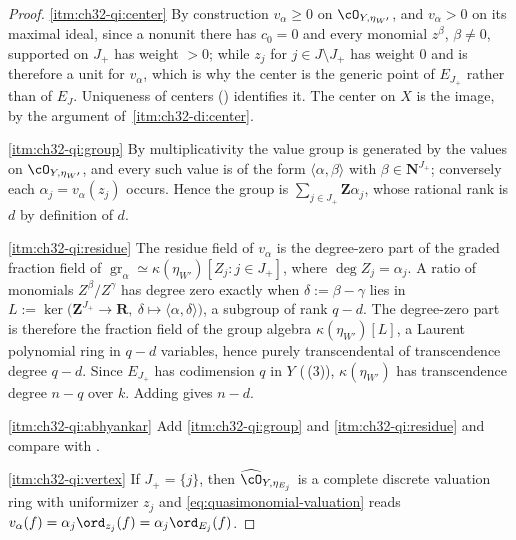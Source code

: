\begin{proof}
\cref{itm:ch32-qi:center}  By construction $v_\alpha\geq0$ on
$\cO_{Y,\eta_{W'}}$, and $v_\alpha>0$ on its maximal ideal, since a
nonunit there has $c_0=0$ and every monomial $z^\beta$, $\beta\neq0$,
supported on $J_+$ has weight $>0$; while $z_j$ for
$j\in J\setminus J_+$ has weight $0$ and is therefore a unit for
$v_\alpha$, which is why the center is the generic point of $E_{J_+}$
rather than of $E_J$.  Uniqueness of centers
() identifies it.  The center on $X$ is
the image, by the argument of
\,\cref{itm:ch32-di:center}.

\cref{itm:ch32-qi:group}  By multiplicativity the value group is generated by
the values on $\cO_{Y,\eta_{W'}}$, and every such value is of the form
$\langle\alpha,\beta\rangle$ with $\beta\in\mathbf N^{J_+}$; conversely
each $\alpha_j=v_\alpha(z_j)$ occurs.  Hence the group is
$\sum_{j\in J_+}\mathbf Z\alpha_j$, whose rational rank is $d$ by
definition of $d$.

\cref{itm:ch32-qi:residue}  The residue field of $v_\alpha$ is the
degree-zero part of the graded fraction field of
$\operatorname{gr}_\alpha\simeq\kappa(\eta_{W'})[Z_j:j\in J_+]$, where
$\deg Z_j=\alpha_j$.  A ratio of monomials $Z^\beta/Z^\gamma$ has degree
zero exactly when $\delta:=\beta-\gamma$ lies in
$L:=\ker\bigl(\mathbf Z^{J_+}\to\mathbf R,\ \delta\mapsto
\langle\alpha,\delta\rangle\bigr)$, a subgroup of rank $q-d$.  The
degree-zero part is therefore the fraction field of the group algebra
$\kappa(\eta_{W'})[L]$, a Laurent polynomial ring in $q-d$ variables,
hence purely transcendental of transcendence degree $q-d$.  Since
$E_{J_+}$ has codimension $q$ in $Y$
(\,(3)), $\kappa(\eta_{W'})$ has transcendence
degree $n-q$ over $k$.  Adding gives $n-d$.

\cref{itm:ch32-qi:abhyankar}  Add \cref{itm:ch32-qi:group} and
\cref{itm:ch32-qi:residue} and compare with
.

\cref{itm:ch32-qi:vertex}  If $J_+=\{j\}$, then
$\widehat{\cO}_{Y,\eta_{E_j}}$ is a complete discrete valuation ring with
uniformizer $z_j$ and \eqref{eq:quasimonomial-valuation} reads
$v_\alpha(f)=\alpha_j\ord_{z_j}(f)=\alpha_j\ord_{E_j}(f)$.


\end{proof}
